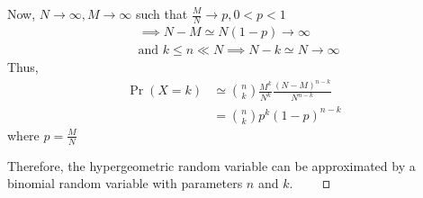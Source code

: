 \documentclass{beamer}
\providecommand{\pr}[1]{\ensuremath{\Pr\left(#1\right)}}
\begin{document}
	\begin{frame}
	Now, $N \to \infty, M \to \infty$ such that $\frac{M}{N} \to p, 0<p<1$
	\begin{align}
		&\implies N-M \simeq N(1-p) \to \infty \\
		&\text{and } k \le n \ll N \implies N-k \simeq N \to \infty
	\end{align}
	Thus,
	\begin{align}
		\pr{X=k} &\simeq \binom{n}{k} \frac{M^k}{N^k} \frac{(N-M)^{n-k}}{N^{n-k}} \\
		&= \binom{n}{k} p^k (1-p)^{n-k}
	\end{align}
	where $p = \frac{M}{N}$
	
	Therefore, the hypergeometric random variable can be approximated by a binomial random variable with parameters $n$ and $k$. $\qed$
	\end{frame}
	
\end{document}
